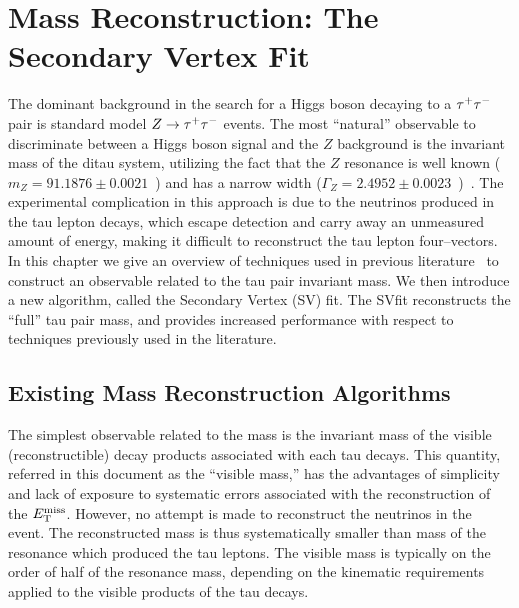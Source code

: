 \ifx\master\undefined\fi
%
\newcommand{\mtau}{m_{\tau}} \newcommand{\mnus}{m_{\nu\nu}}
\newcommand{\mvis}{m_{vis}}
%
\chapter{Mass Reconstruction: The Secondary Vertex Fit} \label{ch:svfit}
%
The dominant background in the search for a Higgs boson decaying to a $\tau^+\tau^-$ pair
is standard model $\mbox{\ensuremath{Z\to\tau^+\tau^-}}$ events.  The most ``natural'' observable to
discriminate between a Higgs boson signal and the $Z$ background is the
invariant mass of the ditau system, utilizing the fact that the $Z$ resonance
is well known ($m_{Z} = 91.1876 \pm 0.0021$~\GeVcc) and has a narrow width
($\Gamma_{Z} = 2.4952 \pm 0.0023$~\GeV)~\cite{PDG}.  The experimental
complication in this approach is due to the neutrinos produced in the tau lepton
decays, which escape detection and carry away an unmeasured amount of energy,
making it difficult to reconstruct the tau lepton four--vectors.  In this
chapter we give an overview of techniques used in previous
literature~\cite{Rainwater:1998kj,CDFMSSMHiggs, CMS-PTDRII} to construct an
observable related to the tau pair invariant mass.  We then introduce a new algorithm,
called the Secondary Vertex (SV) fit.  The SVfit reconstructs the ``full'' tau
pair mass, and provides increased performance with respect to techniques
previously used in the literature.
%
\section{Existing Mass Reconstruction Algorithms}
%
The simplest observable related to the \TT mass is the invariant mass of the
visible (reconstructible) decay products associated with each tau decays.  This
quantity, referred in this document as the ``visible mass,'' has the advantages
of simplicity and lack of exposure to systematic errors associated with the
reconstruction of the $E_{\mathrm{T}}^{\text{miss}}$.  However, no attempt is made to reconstruct the
neutrinos in the event.  The reconstructed mass is thus systematically smaller
than mass of the resonance which produced the tau leptons.  The visible mass is
typically on the order of half of the resonance mass, depending on the
kinematic requirements applied to the visible products of the tau decays. 

